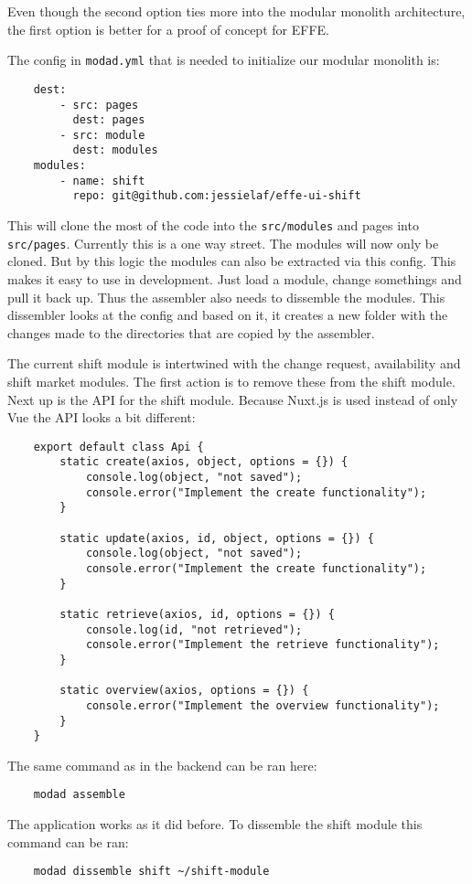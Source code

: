 Even though the second option ties more into the modular monolith architecture, the first option is better for a proof of concept for EFFE.

The config in \texttt{modad.yml} that is needed to initialize our modular monolith is:
\begin{verbatim}
    dest:
        - src: pages
          dest: pages
        - src: module
          dest: modules
    modules:
        - name: shift
          repo: git@github.com:jessielaf/effe-ui-shift
\end{verbatim}

This will clone the most of the code into the \texttt{src/modules} and pages into \texttt{src/pages}. Currently this is a one way street. The modules will now only be cloned. But by this logic the modules can also be extracted via this config. This makes it easy to use in development. Just load a module, change somethings and pull it back up. Thus the assembler also needs to dissemble the modules. This dissembler looks at the config and based on it, it creates a new folder with the changes made to the directories that are copied by the assembler.

The current shift module is intertwined with the change request, availability and shift market modules. The first action is to remove these from the shift module. Next up is the API for the shift module. Because Nuxt.js is used instead of only Vue the API looks a bit different:
\begin{verbatim}
    export default class Api {
        static create(axios, object, options = {}) {
            console.log(object, "not saved");
            console.error("Implement the create functionality");
        }

        static update(axios, id, object, options = {}) {
            console.log(object, "not saved");
            console.error("Implement the create functionality");
        }

        static retrieve(axios, id, options = {}) {
            console.log(id, "not retrieved");
            console.error("Implement the retrieve functionality");
        }

        static overview(axios, options = {}) {
            console.error("Implement the overview functionality");
        }
    }
\end{verbatim}

The same command as in the backend can be ran here:
\begin{verbatim}
    modad assemble
\end{verbatim}

The application works as it did before. To dissemble the shift module this command can be ran:
\begin{verbatim}
    modad dissemble shift ~/shift-module
\end{verbatim}
